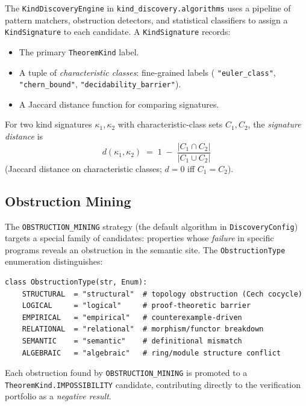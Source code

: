 \documentclass[11pt]{article}
\newcommand{\alg}[1]{\texttt{\small #1}}   %
\begin{document}
The \alg{KindDiscoveryEngine} in \texttt{kind\_discovery.algorithms}
uses a pipeline of pattern matchers, obstruction detectors, and
statistical classifiers to assign a \texttt{KindSignature} to each
candidate.  A \texttt{KindSignature} records:

\begin{itemize}[leftmargin=*]
  \item The primary \alg{TheoremKind} label.
  \item A tuple of \emph{characteristic classes}: fine-grained
    labels (\eg{} \texttt{"euler\_class"}, \texttt{"chern\_bound"},
    \texttt{"decidability\_barrier"}).
  \item A Jaccard distance function for comparing signatures.
\end{itemize}

\begin{definition}
For two kind signatures $\kappa_1, \kappa_2$ with characteristic-class
sets $C_1, C_2$, the \emph{signature distance} is
\[
  d(\kappa_1, \kappa_2)
  \;=\;
  1 \;-\; \frac{|C_1 \cap C_2|}{|C_1 \cup C_2|}
\]
(Jaccard distance on characteristic classes; $d = 0$ iff $C_1 = C_2$).
\end{definition}

\subsection{Obstruction Mining}

The \alg{OBSTRUCTION\_MINING} strategy (the default algorithm in
\texttt{DiscoveryConfig}) targets a special family of candidates:
properties whose \emph{failure} in specific programs reveals an
obstruction in the semantic site.  The \alg{ObstructionType}
enumeration distinguishes:

\begin{lstlisting}[style=jugeo-python, caption={%
  Obstruction type classification.}]
class ObstructionType(str, Enum):
    STRUCTURAL  = "structural"  # topology obstruction (Cech cocycle)
    LOGICAL     = "logical"     # proof-theoretic barrier
    EMPIRICAL   = "empirical"   # counterexample-driven
    RELATIONAL  = "relational"  # morphism/functor breakdown
    SEMANTIC    = "semantic"    # definitional mismatch
    ALGEBRAIC   = "algebraic"   # ring/module structure conflict
\end{lstlisting}

Each obstruction found by \alg{OBSTRUCTION\_MINING} is promoted to a
\alg{TheoremKind.IMPOSSIBILITY} candidate, contributing directly to
the verification portfolio as a \emph{negative result}.
\end{document}

